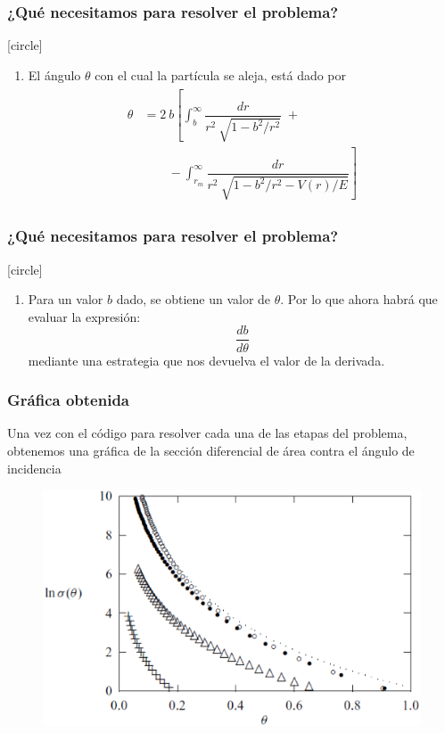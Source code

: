 \begin{frame}
\frametitle{¿Qué necesitamos para resolver el problema?}
[circle]
\begin{enumerate}
\conti
\item El ángulo $\theta$ con el cual la partícula se aleja, está dado por
\begin{align*}
\begin{aligned}
\theta &= 2 \: b \left[ \int_{b}^{\infty} \dfrac{dr}{r^{2} \: \sqrt{1 - b^{2}/r^{2}}} \; + \right. \\
& \qquad - \left. \int_{r_{m}}^{\infty} \dfrac{dr}{r^{2} \: \sqrt{1 - b^{2}/r^{2} - V(r)/E}} \right]
\end{aligned}
\end{align*}
\seti
\end{enumerate}
\end{frame}
\begin{frame}
\frametitle{¿Qué necesitamos para resolver el problema?}
[circle]
\begin{enumerate}
\conti
\item Para un valor $b$ dado, se obtiene un valor de $\theta$. Por lo que ahora habrá que evaluar la expresión:
\[  \dfrac{d b}{d \theta}\]
mediante una estrategia que nos devuelva el valor de la derivada.
\end{enumerate}
\end{frame}
\begin{frame}
\frametitle{Gráfica obtenida}
Una vez con el código para resolver cada una de las etapas del problema, obtenemos una gráfica de la sección diferencial de área contra el ángulo de incidencia
\begin{figure}
\centering
\includegraphics[scale=0.3]{Imagenes/graficadispersion_01.eps} 
\end{figure}
\end{frame}
